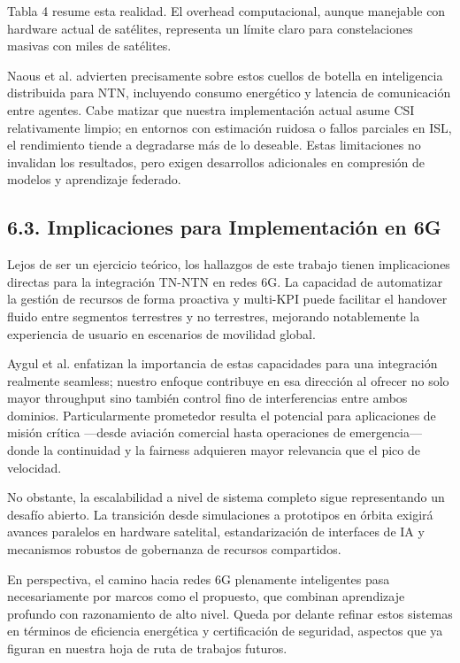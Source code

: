 Tabla 4 resume esta realidad. El overhead computacional, aunque manejable con hardware actual de satélites, representa un límite claro para constelaciones masivas con miles de satélites. 

Naous et al. \cite{Naous2023} advierten precisamente sobre estos cuellos de botella en inteligencia distribuida para NTN, incluyendo consumo energético y latencia de comunicación entre agentes. Cabe matizar que nuestra implementación actual asume CSI relativamente limpio; en entornos con estimación ruidosa o fallos parciales en ISL, el rendimiento tiende a degradarse más de lo deseable. Estas limitaciones no invalidan los resultados, pero exigen desarrollos adicionales en compresión de modelos y aprendizaje federado.

\subsection{6.3. Implicaciones para Implementación en 6G}

Lejos de ser un ejercicio teórico, los hallazgos de este trabajo tienen implicaciones directas para la integración TN-NTN en redes 6G. La capacidad de automatizar la gestión de recursos de forma proactiva y multi-KPI puede facilitar el handover fluido entre segmentos terrestres y no terrestres, mejorando notablemente la experiencia de usuario en escenarios de movilidad global.

Aygul et al. \cite{Aygul2024} enfatizan la importancia de estas capacidades para una integración realmente seamless; nuestro enfoque contribuye en esa dirección al ofrecer no solo mayor throughput sino también control fino de interferencias entre ambos dominios. Particularmente prometedor resulta el potencial para aplicaciones de misión crítica —desde aviación comercial hasta operaciones de emergencia— donde la continuidad y la fairness adquieren mayor relevancia que el pico de velocidad.

No obstante, la escalabilidad a nivel de sistema completo sigue representando un desafío abierto. La transición desde simulaciones a prototipos en órbita exigirá avances paralelos en hardware satelital, estandarización de interfaces de IA y mecanismos robustos de gobernanza de recursos compartidos. 

En perspectiva, el camino hacia redes 6G plenamente inteligentes pasa necesariamente por marcos como el propuesto, que combinan aprendizaje profundo con razonamiento de alto nivel. Queda por delante refinar estos sistemas en términos de eficiencia energética y certificación de seguridad, aspectos que ya figuran en nuestra hoja de ruta de trabajos futuros.